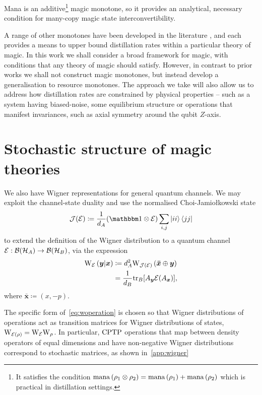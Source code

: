 \documentclass[pra,
aps,
twocolumn,
superscriptaddress,
groupedaddress,
nofootinbib,
reprint
]{revtex4-1}
\begin{document}
Mana is an additive\footnote{It satisfies the condition ${{\rm{mana}}\left(\rho_1 \otimes \rho_2\right)} = {{\rm{mana}}\left(\rho_1\right)} + {{\rm{mana}}\left(\rho_2\right)}$ which is practical in distillation settings.} magic monotone, so it provides an analytical, necessary condition for many-copy magic state interconvertibility.

A range of other monotones have been developed in the literature\cite{Wang_2018} , and each provides a means to upper bound distillation rates within a particular theory of magic. In this work we shall consider a broad framework for magic, with conditions that any theory of magic should satisfy. However, in contrast to prior works we shall not construct magic monotones, but instead develop a generalisation to resource monotones. The approach we take will also allow us to address how distillation rates are constrained by physical properties -- such as a system having biased-noise, some equilibrium structure or operations that manifest invariances, such as axial symmetry around the qubit $Z$-axis.




\section{Stochastic structure of magic theories}
\label{sec:struc}

We also have Wigner representations for general quantum channels. We may exploit the channel-state duality and use the normalised Choi-Jamio\l{}kowski state 
\begin{equation}\label{eq:cj}
  \J(\E) \coloneqq \frac{1}{d_A}(\id \otimes \E) \sum_{i,j} \ket{ii}\bra{jj}
\end{equation}
to extend the definition of the Wigner distribution to a quantum channel $\mathcal{E}: {\mathcal B}({\mathcal H}_A) \rightarrow {\mathcal B}({\mathcal H}_B)$, via the expression
\begin{align}\label{eq:woperation}
    \W[\bmy|\bmx]{\E} 
    &\coloneqq d_A^2 \W[\bm{\bar x} \oplus \bmy]{\J(\E)} \\
    &= \frac{1}{d_B} \tr_B[A_{\bmy} \E(A_{\bmx})],
\end{align}
where $\bm{\bar x} \coloneqq (x, -p)$.

The specific form of~\cref{eq:woperation} is chosen so that Wigner distributions of operations act as transition matrices for Wigner distributions of states, $\W{\E(\rho)} = \W{\E}\W{\rho}$.
In particular, ${\rm{CPTP}}$ operations that map between density operators of equal dimensions and have non-negative Wigner distributions correspond to stochastic matrices, as shown in~\cref{app:wigner}
\end{document}
